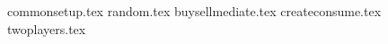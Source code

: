 \documentclass[11pt]{llncs}
\begin{document}
{commonsetup.tex}
{random.tex}
{buysellmediate.tex}
{createconsume.tex}
{twoplayers.tex}
\end{document}
